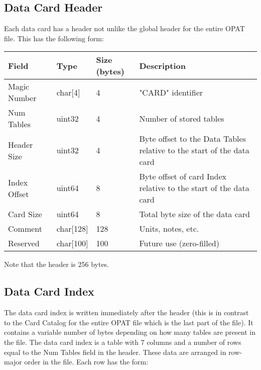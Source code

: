 \documentclass{article}
\begin{document}
\subsection{Data Card Header}
Each data card has a header not unlike the global header for the entire OPAT file.  This has the following form: 
\begin{longtable}{|l|l|l|p{5cm}|}
\hline
\textbf{Field} & \textbf{Type} & \textbf{Size (bytes)} & \textbf{Description} \\
\hline
Magic Number & char[4] & 4 & "CARD" identifier \\
Num Tables & uint32 & 4 & Number of stored tables \\
Header Size & uint32 & 4 & Byte offset to the Data Tables relative to the start of the data card \\
Index Offset & uint64 & 8 & Byte offset of card Index relative to the start of the data card \\
Card Size & uint64 & 8 & Total byte size of the data card \\
Comment & char[128] & 128 & Units, notes, etc. \\
Reserved & char[100] & 100 & Future use (zero-filled) \\
\hline
\end{longtable} 
Note that the header is 256 bytes. 

\subsection{Data Card Index}
The data card index is written immediately after the header (this is in contrast
to the Card Catalog for the entire OPAT file which is the last part of the
file).  It contains a variable number of bytes depending on how many tables are
present in the file.  The data card index is a table with 7 columns and a
number of rows equal to the Num Tables field in the header.  These data are
arranged in row-major order in the file.  Each row has the form: 
\end{document}
